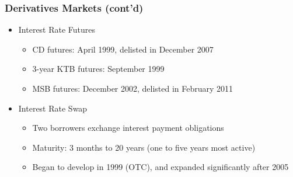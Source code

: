 \documentclass[10pt]{beamer}
\begin{document}
	
	\begin{frame}
		\frametitle{Derivatives Markets (cont'd)}
		
		\begin{itemize} \vspace{5pt} \itemsep10pt
			\item Interest Rate Futures
			\begin{itemize} \vspace{5pt} \itemsep10pt
				\item CD futures: April 1999, delisted in December 2007
				
				\item 3-year KTB futures: September 1999
				\item MSB futures: December 2002, delisted in February 2011
			\end{itemize}
			
			\item Interest Rate Swap
			\begin{itemize} \vspace{5pt} \itemsep10pt
				\item Two borrowers exchange interest payment obligations
				\item Maturity: 3 months to 20 years (one to five years most active)
				\item Began to develop in 1999 (OTC), and expanded
				significantly after 2005
			\end{itemize}
			
		\end{itemize}
		
	\end{frame}
	
	
	
\end{document}
